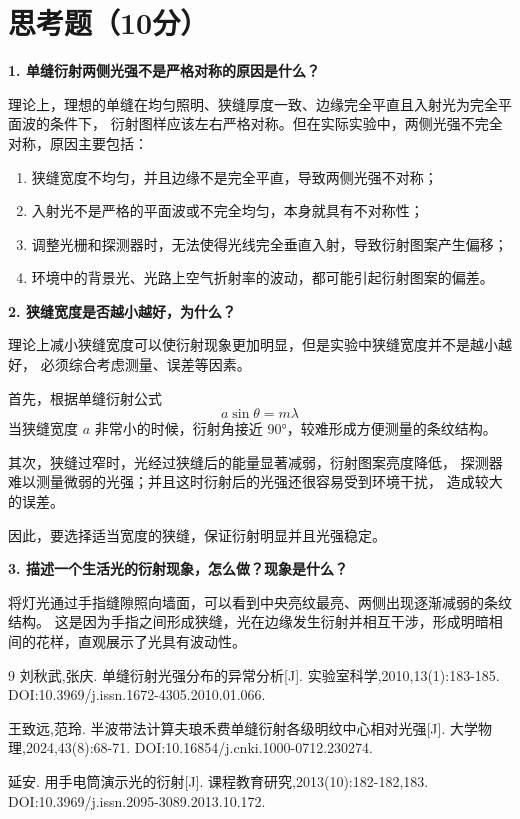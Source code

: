 \documentclass{Phyport}
\begin{document}
\section{思考题（10分）}

\textbf{1. 单缝衍射两侧光强不是严格对称的原因是什么？}

理论上，理想的单缝在均匀照明、狭缝厚度一致、边缘完全平直且入射光为完全平面波的条件下，
衍射图样应该左右严格对称。但在实际实验中，两侧光强不完全对称，原因主要包括：
\begin{enumerate}
    \item 狭缝宽度不均匀，并且边缘不是完全平直，导致两侧光强不对称；
    \item 入射光不是严格的平面波或不完全均匀，本身就具有不对称性；
    \item 调整光栅和探测器时，无法使得光线完全垂直入射，导致衍射图案产生偏移；
    \item 环境中的背景光、光路上空气折射率的波动，都可能引起衍射图案的偏差。
\end{enumerate}

\textbf{2. 狭缝宽度是否越小越好，为什么？}

理论上减小狭缝宽度可以使衍射现象更加明显，但是实验中狭缝宽度并不是越小越好，
必须综合考虑测量、误差等因素。

首先，根据单缝衍射公式
\[
a \sin \theta = m \lambda
\]
当狭缝宽度 $a$ 非常小的时候，衍射角接近 90°，较难形成方便测量的条纹结构。

其次，狭缝过窄时，光经过狭缝后的能量显著减弱，衍射图案亮度降低，
探测器难以测量微弱的光强；并且这时衍射后的光强还很容易受到环境干扰，
造成较大的误差。

因此，要选择适当宽度的狭缝，保证衍射明显并且光强稳定。

\textbf{3. 描述一个生活光的衍射现象，怎么做？现象是什么？}

将灯光通过手指缝隙照向墙面，可以看到中央亮纹最亮、两侧出现逐渐减弱的条纹结构。
这是因为手指之间形成狭缝，光在边缘发生衍射并相互干涉，形成明暗相间的花样，直观展示了光具有波动性。

\begin{thebibliography}{9}
    刘秋武,张庆. 单缝衍射光强分布的异常分析[J]. 实验室科学,2010,13(1):183-185. DOI:10.3969/j.issn.1672-4305.2010.01.066. 

    王致远,范玲. 半波带法计算夫琅禾费单缝衍射各级明纹中心相对光强[J]. 大学物理,2024,43(8):68-71. DOI:10.16854/j.cnki.1000-0712.230274.
    
    延安. 用手电筒演示光的衍射[J]. 课程教育研究,2013(10):182-182,183. DOI:10.3969/j.issn.2095-3089.2013.10.172. 

\end{thebibliography}


\end{document}
